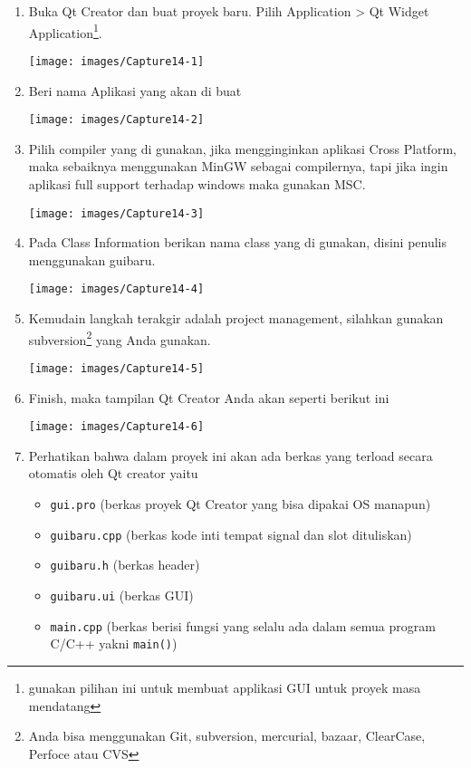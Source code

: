 \begin{enumerate}
	\item Buka Qt Creator dan buat proyek baru. Pilih Application \textgreater{} Qt Widget Application\footnote{gunakan pilihan ini untuk membuat applikasi GUI untuk proyek masa mendatang}.
	
		\texttt{[image: images/Capture14-1]}
		
		\item Beri nama Aplikasi yang akan di buat
		
		\texttt{[image: images/Capture14-2]}
		
		\item Pilih compiler yang di gunakan, jika mengginginkan aplikasi Cross Platform, maka sebaiknya menggunakan MinGW sebagai compilernya, tapi jika ingin aplikasi full support terhadap windows maka gunakan MSC.
		
		\texttt{[image: images/Capture14-3]}
		
		\item  Pada Class Information berikan nama class yang di gunakan, disini penulis menggunakan guibaru.
		
		\texttt{[image: images/Capture14-4]}
		
		\item Kemudain langkah terakgir adalah project management, silahkan gunakan subversion\footnote{Anda bisa menggunakan Git, subversion, mercurial, bazaar, ClearCase, Perfoce atau CVS} yang Anda gunakan.
		
		\texttt{[image: images/Capture14-5]}
		
		\item Finish, maka tampilan Qt Creator Anda akan seperti berikut ini
		
		\texttt{[image: images/Capture14-6]}
		
		\item Perhatikan bahwa dalam proyek ini akan ada berkas yang terload secara otomatis oleh Qt creator yaitu
		
		\begin{itemize}
			\item \texttt{gui.pro} (berkas proyek Qt Creator yang bisa dipakai OS manapun)
			\item  \texttt{guibaru.cpp} (berkas kode inti tempat signal dan slot dituliskan)
			\item \texttt{guibaru.h} (berkas header)
			\item \texttt{guibaru.ui} (berkas GUI)
			\item \texttt{main.cpp} (berkas berisi fungsi yang selalu ada dalam semua program C/C++ yakni \texttt{main()})
			
		\end{itemize}
	
\end{enumerate}

